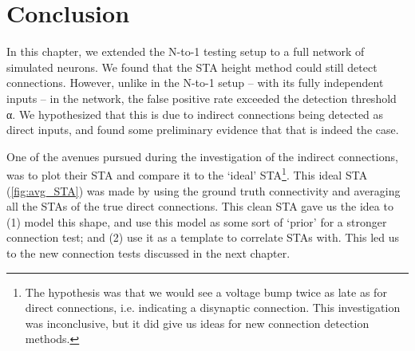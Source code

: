 \section{Conclusion}

In this chapter, we extended the N-to-1 testing setup to a full network of simulated neurons. We found that the STA height method could still detect connections. However, unlike in the N-to-1 setup -- with its fully independent inputs -- in the network, the false positive rate exceeded the detection threshold α. We hypothesized that this is due to indirect connections being detected as direct inputs, and found some preliminary evidence that that is indeed the case.


One of the avenues pursued during the investigation of the indirect connections, was to plot their STA and compare it to the `ideal' STA\footnote{
    The hypothesis was that we would see a voltage bump twice as late as for direct connections, i.e. indicating a disynaptic connection. This investigation was inconclusive, but it did give us ideas for new connection detection methods.
}. This ideal STA (\cref{fig:avg_STA}) was made by using the ground truth connectivity and averaging all the STAs of the true direct connections. This clean STA gave us the idea to (1) model this shape, and use this model as some sort of `prior' for a stronger connection test; and (2) use it as a template to correlate STAs with. This led us to the new connection tests discussed in the next chapter.
